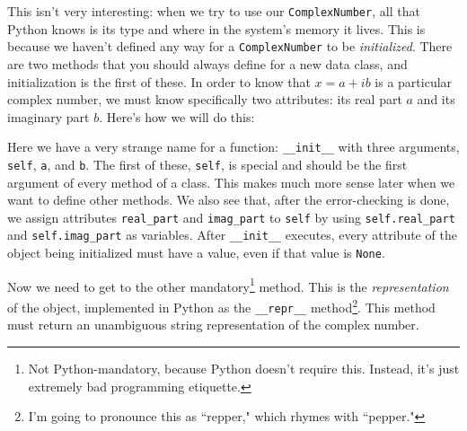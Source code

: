 \documentclass[m3380-lec-main.tex]{subfiles}
\begin{document}
\smallskip\noindent
This isn't very interesting: when we try to use our \verb|ComplexNumber|, all that Python knows is its type and where in the system's memory it lives. This is because we haven't defined any way for a \verb|ComplexNumber| to be \emph{initialized}. There are two methods that you should always define for a new data class, and initialization is the first of these. In order to know that $x=a+ib$ is a particular complex number, we must know specifically two attributes: its real part $a$ and its imaginary part $b$. Here's how we will do this:

\smallskip\noindent

Here we have a very strange name for a function: \verb|__init__| with three arguments, \verb|self|, \verb|a|, and \verb|b|. The first of these, \verb|self|, is special and should be the first argument of every method of a class. This makes much more sense later when we want to define other methods. We also see that, after the error-checking is done, we assign attributes \verb|real_part| and \verb|imag_part| to \verb|self| by using \verb|self.real_part| and \verb|self.imag_part| as variables. After \verb|__init__| executes, every attribute of the object being initialized must have a value, even if that value is \verb|None|.

Now we need to get to the other mandatory\footnote{Not Python-mandatory, because Python doesn't require this. Instead, it's just extremely bad programming etiquette.} method. This is the \emph{representation} of the object, implemented in Python as the \verb|__repr__| method\footnote{I'm going to pronounce this as ``repper," which rhymes with ``pepper."}. This method must return an unambiguous string representation of the complex number.
\end{document}
